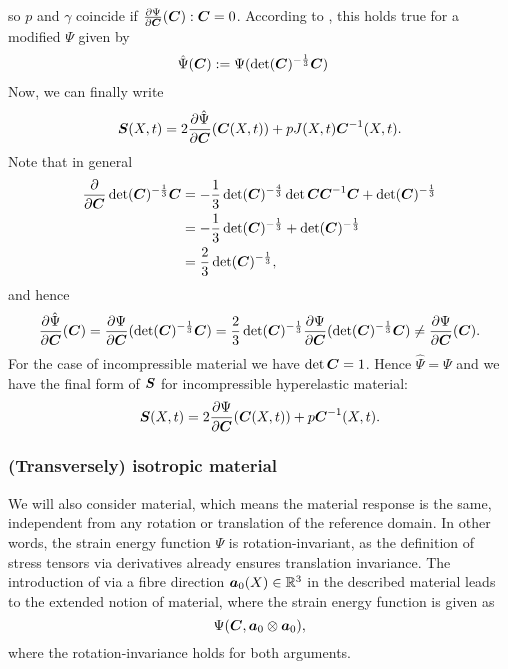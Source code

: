 so $p$ and $\gamma$ coincide if $\frac{\partial \Psi}{\partial \boldsymbol{C}}(\boldsymbol{C}):\boldsymbol{C} = 0$.
According to \cite[p. 168]{Bonet2008}, this holds true for a modified $\Psi$ given by
\begin{align}
	\hat{\Psi}(\boldsymbol{C}) &:= \Psi(\det(\boldsymbol{C})^{-\frac{1}{3}}\boldsymbol{C})
\end{align}
Now, we can finally write
\begin{align}
	\boldsymbol{S}(X,t) = 2\frac{\partial \hat\Psi}{\partial \boldsymbol{C}}(\boldsymbol{C}(X,t)) + pJ(X,t)\boldsymbol{C}^{-1}(X,t).\label{def:secondpiola_pressure}
\end{align}
Note that in general
\begin{align*}
	\frac{\partial }{\partial \boldsymbol{C}}\det(\boldsymbol{C})^{-\frac{1}{3}}\boldsymbol{C} &= -\frac{1}{3}\det(\boldsymbol{C})^{-\frac{4}{3}}\det\boldsymbol{C} \boldsymbol{C}^{-1} \boldsymbol{C} + \det(\boldsymbol{C})^{-\frac{1}{3}}\\
		&=-\frac{1}{3}\det(\boldsymbol{C})^{-\frac{1}{3}} + \det(\boldsymbol{C})^{-\frac{1}{3}}\\
		&=\frac{2}{3}\det(\boldsymbol{C})^{-\frac{1}{3}},
\end{align*}
and hence
\begin{align}
	\frac{\partial \hat\Psi}{\partial \boldsymbol{C}}(\boldsymbol{C}) = \frac{\partial \Psi}{\partial \boldsymbol{C}}(\det(\boldsymbol{C})^{-\frac{1}{3}}\boldsymbol{C})
	= \frac{2}{3}\det(\boldsymbol{C})^{-\frac{1}{3}}\frac{\partial \Psi}{\partial \boldsymbol{C}}(\det(\boldsymbol{C})^{-\frac{1}{3}}\boldsymbol{C}) \neq \frac{\partial \Psi}{\partial \boldsymbol{C}}(\boldsymbol{C}).  
\end{align}
For the case of incompressible material we have $\det\boldsymbol{C} = 1$.
Hence $\hat{\Psi} = \Psi$ and we have the final form of $\boldsymbol{S}$ for incompressible hyperelastic material:
\begin{align}
	\boldsymbol{S}(X,t) = 2\frac{\partial \Psi}{\partial \boldsymbol{C}}(\boldsymbol{C}(X,t)) + p\boldsymbol{C}^{-1}(X,t).\label{def:incompressible_secondpiola_pressure}
\end{align}

\subsubsection{(Transversely) isotropic material}
We will also consider  material, which means the material response is the same, independent from any rotation or translation of
the reference domain.
In other words, the strain energy function $\Psi$ is rotation-invariant, as the definition of stress tensors via derivatives already ensures translation invariance. 
The introduction of  via a fibre direction $\boldsymbol{a}_0(X)\in\mathbb{R}^3$
in the described material leads to the extended notion of  material, where
the strain energy function is given as
\[
	\Psi(\boldsymbol{C},\boldsymbol{a}_0\otimes \boldsymbol{a}_0),
\]
where the rotation-invariance holds for both arguments.

